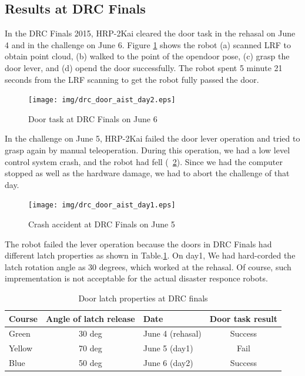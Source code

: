 \subsection{Results at DRC Finals}
%
In the DRC Finals 2015, HRP-2Kai cleared the door task in the rehasal on June 4 and in
the challenge on June 6. Figure \ref{fig:drc_door_aist_day2} shows the robot (a) scanned LRF 
to obtain point cloud, (b) walked to the point of the opendoor pose, (c) grasp the door lever, and (d)
 opend the door successfully. The robot spent 5 minute 21 seconds from the LRF scanning to get the 
robot fully passed the door.
%
\begin{figure}[t]
  \centering
  \texttt{[image: img/drc\_door\_aist\_day2.eps]}
  \caption{Door task at DRC Finals on June 6}
  \label{fig:drc_door_aist_day2}
\end{figure}

In the challenge on June 5, HRP-2Kai failed the door lever operation and tried to
grasp again by manual teleoperation. During this operation, we had a low level control system crash, 
and the robot had fell (\figurename~\ref{fig:drc_door_aist_day1}).
Since we had the computer stopped as well as the hardware damage, we had to abort the challenge of that day. 
%
\begin{figure}[t]
  \centering
  \texttt{[image: img/drc\_door\_aist\_day1.eps]}
  \caption{Crash accident at DRC Finals on June 5}
  \label{fig:drc_door_aist_day1}
\end{figure}

The robot failed the lever operation because the doors in DRC Finals had different latch properties
as shown in Table.\ref{tbl:door_latch}. On day1, We had hard-corded the latch rotation angle as 30 degrees,
which worked at the rehasal. Of course, such imprementation is not acceptable 
for the actual disaster responce robots.
%
\begin{table}[htb]
\caption{Door latch properties at DRC finals} \label{tbl:door_latch}
\begin{tabular}{lclc}
\hline
Course & Angle of latch release & Date & Door task result  \\ 
\hline
Green & 30 deg & June 4 (rehasal) & Success  \\
Yellow & 70 deg & June 5 (day1) & Fail \\
Blue &  50 deg & June 6 (day2)  & Success \\
\hline
\end{tabular}
\end{table}

